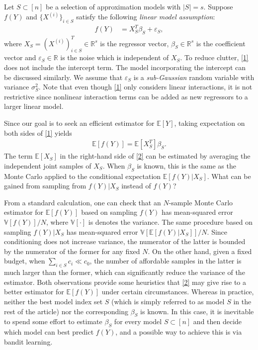 \documentclass[a4paper,11pt]{article}
\numberwithin{equation}{section}
\theoremstyle{plain}
\theoremstyle{definition}
\def\R{{\mathbb R}}
\def\E{{\mathbb E}}
\def\R{{\mathbb R}}
\def\V{{\mathbb V}}
\def\e{{\varepsilon}}
\begin{document}
Let $S\subset [n]$ be a selection of approximation models with $|S| = s$.  
Suppose $f(Y)$ and $\{X^{(i)}\}_{i\in S}$ satisfy the following \emph{linear model assumption}:
\begin{align}
f(Y) &= X_S^T\beta_S + \e_S,\label{1}
\end{align}
where $X_S = (X^{(i)})_{i\in S}^T\in\R^{s}$ is the regressor vector, $\beta_S\in\R^{s}$ is the coefficient vector and $\e_S\in\R$ is the noise which is independent of $X_S$. 
To reduce clutter, \eqref{1} does not include the intercept term. 
The model incorporating the intercept can be discussed similarly. 
We assume that $\e_S$ is a \emph{sub-Gaussian} random variable with variance $\sigma_S^2$. 
Note that even though \eqref{1} only considers linear interactions, it is not restrictive since nonlinear interaction terms can be added as new regressors to a larger linear model. 

  
Since our goal is to seek an efficient estimator for $\E[Y]$, taking expectation on both sides of \eqref{1} yields
\begin{align}
\E[f(Y)] = \E[X_S^T]\beta_S.\label{2}
\end{align}
The term $\E[X_S]$ in the right-hand side of \eqref{2} can be estimated by averaging the independent joint samples of $X_S$. 
When $\beta_S$ is known, this is the same as the Monte Carlo applied to the conditional expectation $\E[f(Y)|X_S]$. What can be gained from sampling from $f(Y)|X_S$ instead of $f(Y)$? 

From a standard calculation, one can check that an $N$-sample Monte Carlo estimator for $\E[f(Y)]$ based on sampling $f(Y)$ has mean-squared error $\V[f(Y)]/N$, where $\V[ \cdot ]$ is denotes the variance.
The same procedure based on sampling $f(Y)|X_S$ has mean-squared error $\V[\E[f(Y)|X_S]]/N$. 
Since conditioning does not increase variance, the numerator of the latter is bounded by the numerator of the former for any fixed $N$. 
On the other hand, given a fixed budget, when $\sum_{i\in S}c_i\ll c_0$, the number of affordable samples in the latter is much larger than the former, which can significantly reduce the variance of the estimator.  
Both observations provide some heuristics that \eqref{2} may give rise to a better estimator for $\E[f(Y)]$ under certain circumstances. 
Whereas in practice, neither the best model index set $S$ (which is simply referred to as model $S$ in the rest of the article) nor the corresponding $\beta_S$ is known. 
In this case, it is inevitable to spend some effort to estimate $\beta_S$ for every model $S\subset [n]$ and then decide which model can best predict $f(Y)$, and a possible way to achieve this is via bandit learning. 
\end{document}
